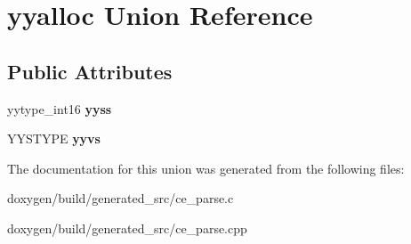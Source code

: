 \hypertarget{unionyyalloc}{}\section{yyalloc Union Reference}
\label{unionyyalloc}
\subsection*{Public Attributes}
\begin{DoxyCompactItemize}
\item 
\mbox{\label{unionyyalloc_aad44e4a724037e32eeb58333c516bb45}} 
yytype\+\_\+int16 {\bfseries yyss}
\item 
\mbox{\label{unionyyalloc_a9494cc8d8cd0eba1b44ca20fe89de5d2}} 
Y\+Y\+S\+T\+Y\+PE {\bfseries yyvs}
\end{DoxyCompactItemize}


The documentation for this union was generated from the following files\+:\begin{DoxyCompactItemize}
\item 
doxygen/build/generated\+\_\+src/ce\+\_\+parse.\+c\item 
doxygen/build/generated\+\_\+src/ce\+\_\+parse.\+cpp\end{DoxyCompactItemize}
